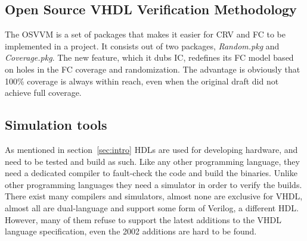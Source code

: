 \documentclass[11pt,british]{article}
\begin{document}

\subsection{Open Source VHDL Verification Methodology}
The \gls{OSVVM} is a set of packages that makes it easier for \gls{CRV} and \gls{FC} to be implemented in a project. It consists out of two packages, \emph{Random.pkg} and \emph{Coverage.pkg}. The new feature, which it dubs \gls{IC}, redefines its FC model based on holes in the FC coverage and randomization. The advantage is obviously that 100\% coverage is always within reach, even when the original draft did not achieve full coverage.\cite{ICoverage}


\subsection{Simulation tools}
As mentioned in section~\ref{sec:intro} \gls{HDL}s are used for developing hardware, and need to be tested and build as such. Like any other programming language, they need a dedicated compiler to fault-check the code and build the binaries. Unlike other programming languages they need a simulator in order to verify the builds. There exist many compilers and simulators, almost none are exclusive for \gls{VHDL}, almost all are dual-language and support some form of Verilog, a different HDL. However, many of them refuse to support the latest additions to the VHDL language specification, even the 2002 additions are hard to be found.

\label{subsec:simtool}
\end{document}
